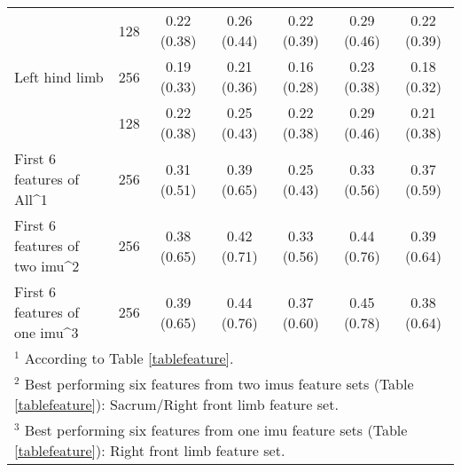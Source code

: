 \begin{table}[htbp]
{\begin{tabular}[H]{lcccccc}
     &\multicolumn{1}{c}{128}& \multicolumn{1}{c}{\cellcolor{blue!10}0.22 (0.38)} &  \multicolumn{1}{c}{\cellcolor{red!20}0.26 (0.44)} &  \multicolumn{1}{c}{\cellcolor{blue!10}0.22 (0.39)} &  \multicolumn{1}{c}{\cellcolor{red!28}0.29 (0.46)} &  \multicolumn{1}{c}{{\cellcolor{blue!10}0.22 (0.39)}} \\ 

    \multicolumn{1}{l}{Left hind limb} &\multicolumn{1}{c}{256} & \multicolumn{1}{c}{{\cellcolor{blue!18}0.19 (0.33)}} &  \multicolumn{1}{c}{\cellcolor{blue!10}0.21 (0.36)} & \multicolumn{1}{c}{\cellcolor{blue!40}0.16 (0.28)}  & \multicolumn{1}{c}{\cellcolor{red!10}0.23 (0.38)}  & \multicolumn{1}{c}{\cellcolor{blue!25}0.18 (0.32)}\\
    
    &\multicolumn{1}{c}{128}& \multicolumn{1}{c}{{\cellcolor{blue!10}0.22 (0.38)}} &  \multicolumn{1}{c}{\cellcolor{red!15}0.25 (0.43)} &  \multicolumn{1}{c}{\cellcolor{blue!10}0.22 (0.38)} &  \multicolumn{1}{c}{\cellcolor{red!28}0.29 (0.46)} &  \multicolumn{1}{c}{\cellcolor{blue!10}0.21 (0.38)} \\
    
    \multicolumn{1}{l}{First 6 features of All^1} &\multicolumn{1}{c}{256} & \multicolumn{1}{c}{{\cellcolor{red!35}0.31 (0.51)}} &  \multicolumn{1}{c}{\cellcolor{red!50}0.39 (0.65)} & \multicolumn{1}{c}{\cellcolor{red!15}0.25 (0.43)}  & \multicolumn{1}{c}{\cellcolor{red!35}0.33 (0.56)}  & \multicolumn{1}{c}{\cellcolor{red!45}0.37 (0.59)}\\
    
    \multicolumn{1}{l}{First 6 features of two \gls{imu}^2} &\multicolumn{1}{c}{256} & \multicolumn{1}{c}{{\cellcolor{red!50}0.38 (0.65)}} &  \multicolumn{1}{c}{\cellcolor{red!55}0.42 (0.71)} & \multicolumn{1}{c}{\cellcolor{red!35}0.33 (0.56)}  & \multicolumn{1}{c}{\cellcolor{red!60}0.44 (0.76)}  & \multicolumn{1}{c}{\cellcolor{red!50}0.39 (0.64)}\\
    
    \multicolumn{1}{l}{First 6 features of one \gls{imu}^3} &\multicolumn{1}{c}{256} & \multicolumn{1}{c}{{\cellcolor{red!50}0.39 (0.65)}} &  \multicolumn{1}{c}{\cellcolor{red!60}0.44 (0.76)} & \multicolumn{1}{c}{\cellcolor{red!45}0.37 (0.60)}  & \multicolumn{1}{c}{\cellcolor{red!60}0.45 (0.78)}  & \multicolumn{1}{c}{\cellcolor{red!50}0.38 (0.64)}\\
    
       \bottomrule
       
       \multicolumn{7}{l}{\small $^1$ According to Table \ref{tablefeature}.}  \\
       
       \multicolumn{7}{l}{\small $^2$ Best performing six features from two \gls{imu}s feature sets (Table \ref{tablefeature}): Sacrum/Right front limb feature set.}\\
       
       \multicolumn{7}{l}{\small $^3$ Best performing six features from one \gls{imu} feature sets (Table \ref{tablefeature}): Right front limb feature set.}\\
       \end{tabular}}
    \label{resultsallT}
\end{table}